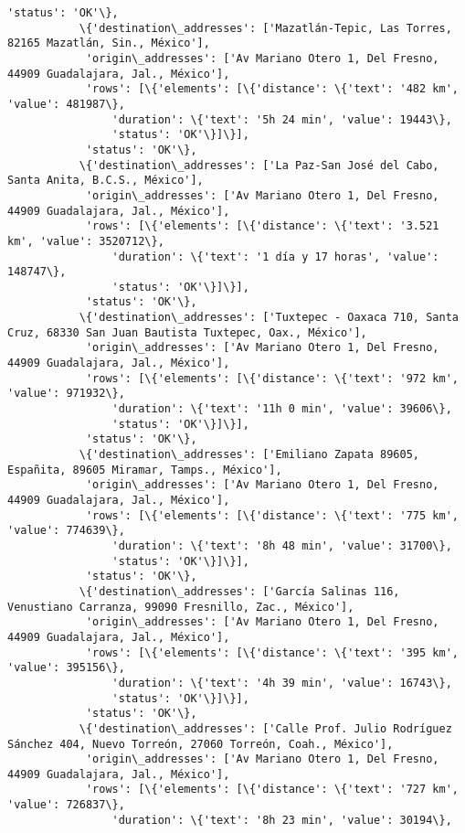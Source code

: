 \documentclass[11pt]{article}
\begin{document}
\begin{Verbatim}[commandchars=\\\{\}]
            'status': 'OK'\},
           \{'destination\_addresses': ['Mazatlán-Tepic, Las Torres, 82165 Mazatlán, Sin., México'],
            'origin\_addresses': ['Av Mariano Otero 1, Del Fresno, 44909 Guadalajara, Jal., México'],
            'rows': [\{'elements': [\{'distance': \{'text': '482 km', 'value': 481987\},
                'duration': \{'text': '5h 24 min', 'value': 19443\},
                'status': 'OK'\}]\}],
            'status': 'OK'\},
           \{'destination\_addresses': ['La Paz-San José del Cabo, Santa Anita, B.C.S., México'],
            'origin\_addresses': ['Av Mariano Otero 1, Del Fresno, 44909 Guadalajara, Jal., México'],
            'rows': [\{'elements': [\{'distance': \{'text': '3.521 km', 'value': 3520712\},
                'duration': \{'text': '1 día y 17 horas', 'value': 148747\},
                'status': 'OK'\}]\}],
            'status': 'OK'\},
           \{'destination\_addresses': ['Tuxtepec - Oaxaca 710, Santa Cruz, 68330 San Juan Bautista Tuxtepec, Oax., México'],
            'origin\_addresses': ['Av Mariano Otero 1, Del Fresno, 44909 Guadalajara, Jal., México'],
            'rows': [\{'elements': [\{'distance': \{'text': '972 km', 'value': 971932\},
                'duration': \{'text': '11h 0 min', 'value': 39606\},
                'status': 'OK'\}]\}],
            'status': 'OK'\},
           \{'destination\_addresses': ['Emiliano Zapata 89605, Españita, 89605 Miramar, Tamps., México'],
            'origin\_addresses': ['Av Mariano Otero 1, Del Fresno, 44909 Guadalajara, Jal., México'],
            'rows': [\{'elements': [\{'distance': \{'text': '775 km', 'value': 774639\},
                'duration': \{'text': '8h 48 min', 'value': 31700\},
                'status': 'OK'\}]\}],
            'status': 'OK'\},
           \{'destination\_addresses': ['García Salinas 116, Venustiano Carranza, 99090 Fresnillo, Zac., México'],
            'origin\_addresses': ['Av Mariano Otero 1, Del Fresno, 44909 Guadalajara, Jal., México'],
            'rows': [\{'elements': [\{'distance': \{'text': '395 km', 'value': 395156\},
                'duration': \{'text': '4h 39 min', 'value': 16743\},
                'status': 'OK'\}]\}],
            'status': 'OK'\},
           \{'destination\_addresses': ['Calle Prof. Julio Rodríguez Sánchez 404, Nuevo Torreón, 27060 Torreón, Coah., México'],
            'origin\_addresses': ['Av Mariano Otero 1, Del Fresno, 44909 Guadalajara, Jal., México'],
            'rows': [\{'elements': [\{'distance': \{'text': '727 km', 'value': 726837\},
                'duration': \{'text': '8h 23 min', 'value': 30194\},

\end{Verbatim}
\end{document}
